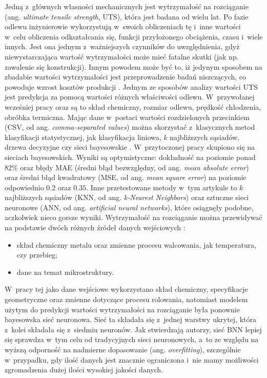 Jedną z~głównych własności mechanicznych jest wytrzymałość na rozciąganie (ang. \textit{ultimate tensile strength}, UTS), która jest badana od wielu lat. Po fazie odlewu inżynierowie wykorzystują w~swoich obliczeniach tę i~inne wartości w~celu obliczenia odkształcania się, funkcji przyłożonego obciążenia, czasu i~wiele innych. Jest ona jednym z~ważniejszych czynników do uwzględnienia, gdyż niewystarczająca wartość wytrzymałości może mieć fatalne skutki (jak np. zawalenie się konstrukcji). Innym powodem może być to, iż jedynym sposobem na zbadabie wartości wytrzymałości jest przeprowadzenie badań niszczących, co powoduje wzrost kosztów produkcji \cite{Santos09}. Jednym ze sposobów analizy wartości UTS jest predykcja za pomocą wartości różnych właściwości odlewu. W~przywołanej wcześniej pracy \cite{Santos09} oraz \cite{Nieves09} są to skład chemiczny, rozmiar odlewu, prędkość chłodzenia, obróbka termiczna. Mając dane w~postaci wartości rozdzielonych przecinkiem (CSV, od ang. \textit{comma-separated values}) można skorzystać z~klasycznych metod klasyfikacji statystycznej, jak klasyfikacja liniowa, $k$ najbliższych sąsiadów, drzewa decyzyjne czy sieci bayesowskie \cite{wiki:klas.stat}. W~przytoczonej pracy skupiono się na sieciach bayesowskich. Wyniki są optymistyczne: dokładność na poziomie ponad 82\% oraz błędy MAE (średni błąd bezwzględny, od ang. \textit{mean absolute error}) oraz średni błąd kwadratowy (MSE, od ang. \textit{mean square error}) na poziomie odpowiednio $0.2$ oraz $0.35$. Inne przetestowane metody w~tym artykule to $k$ najbliższych sąsiadów (KNN, od ang. \textit{k-Nearest Neighbors}) oraz sztuczne sieci neuronowe (ANN, od ang. \textit{artificial neural networks}), które osiągnęły podobne, aczkolwiek nieco gorsze wyniki. 
Wytrzymałość na rozciąganie można przewidywać na podstawie dwóch różnych źródeł danych wejściowych \cite{Yang16}:
\begin{itemize}
\item
skład chemiczny metalu oraz zmienne procesu walcowania, jak temperatura, czy przebieg;
\item
dane na temat mikrostruktury. 
\end{itemize} 

\noindent W~pracy tej jako dane wejściowe wykorzystano skład chemiczny, specyfikacje geometryczne oraz zmienne dotyczące procesu rolowania, natomiast modelem użytym do predykcji wartości wytrzymałości na rozciąganie była ponownie bayesowska sieć neuronowa. Sieć ta składała się z~jednej warstwy ukrytej, która z~kolei składała się z~siedmiu neuronów. Jak stwierdzają autorzy, sieć BNN lepiej się sprawdza w~tym celu od tradycyjnych sieci neuronowych, a~to ze względu na wyższą odporność na nadmierne dopasowanie (ang. \textit{overfitting}), szczególnie w~przypadku, gdy ilość danych jest znacznie ograniczona i~nie mamy możliwości zgromadzenia dużej ilości wysokiej jakości danych.
    
